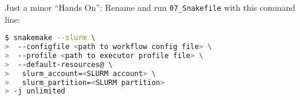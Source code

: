 \begin{frame}[fragile]
  \frametitle{}
  Just a minor ``Hands On'': Rename and run \texttt{07\_Snakefile} with this command line:
         \begin{lstlisting}[language=Bash, style=Shell]
$ snakemake --slurm \
>  --configfile <path to workflow config file> \
>  --profile <path to executor profile file> \
>  --default-resources@ \ 
>   slurm_account=<SLURM account> \
>   slurm_partition=<SLURM partition> 
> -j unlimited
    \end{lstlisting}
\end{frame}

